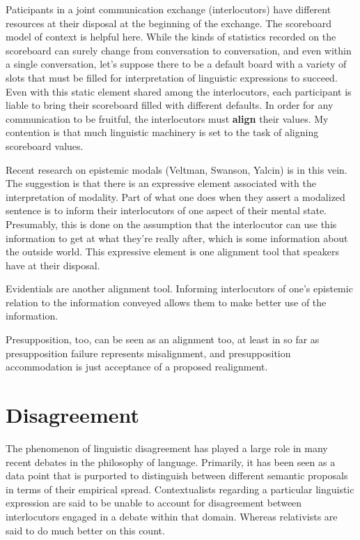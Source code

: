 \documentclass[letterpaper,10pt]{article}
\begin{document}
Paticipants in a joint communication exchange (interlocutors) have different resources at their disposal at the beginning of the exchange. The scoreboard model of context is helpful here.  While the kinds of statistics recorded on the scoreboard can surely change from conversation to conversation, and even within a single conversation, let's suppose there to be a default board with a variety of slots that must be filled for interpretation of linguistic expressions to succeed.  Even with this static element shared among the interlocutors, each participant is liable to bring their scoreboard filled with different defaults.  In order for any communication to be fruitful, the interlocutors must \textbf{align} their values.  My contention is that much linguistic machinery is set to the task of aligning scoreboard values.

Recent research on epistemic modals (Veltman, Swanson, Yalcin) is in this vein.  The suggestion is that there is an expressive element associated with the interpretation of modality.  Part of what one does when they assert a modalized sentence is to inform their interlocutors of one aspect of their mental state.  Presumably, this is done on the assumption that the interlocutor can use this information to get at what they're really after, which is some information about the outside world.  This expressive element is one alignment tool that speakers have at their disposal.

Evidentials are another alignment tool.  Informing interlocutors of one's epistemic relation to the information conveyed allows them to make better use of the information.

Presupposition, too, can be seen as an alignment too, at least in so far as presupposition failure represents misalignment, and presupposition accommodation is just acceptance of a proposed realignment.

\section{Disagreement}

The phenomenon of linguistic disagreement has played a large role in many recent debates in the philosophy of language.  Primarily, it has been seen as a data point that is purported to distinguish between different semantic proposals in terms of their empirical spread.  Contextualists regarding a particular linguistic expression are said to be unable to account for disagreement between interlocutors engaged in a debate within that domain.  Whereas relativists are said to do much better on this count.
\end{document}

